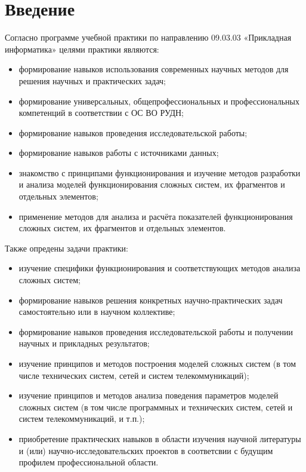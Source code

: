 \chapter*{Введение}

Согласно программе учебной практики по направлению 09.03.03
«Прикладная информатика» целями практики являются:
\begin{itemize}
\item формирование навыков использования современных научных методов
  для решения научных и практических задач;
\item формирование универсальных, общепрофессиональных и
  профессиональных компетенций в соответствии с ОС ВО РУДН;
\item формирование навыков проведения исследовательской работы;
\item формирование навыков работы с источниками данных;
\item знакомство с принципами функционирования и изучение методов
  разработки и анализа моделей функционирования сложных систем, их
  фрагментов и отдельных элементов;
\item применение методов для анализа и расчёта показателей
  функционирования сложных систем, их фрагментов и отдельных
  элементов.
\end{itemize}

Также опредены задачи практики:
\begin{itemize}
\item изучение специфики функционирования и соответствующих методов
  анализа сложных систем;
\item формирование навыков решения конкретных научно-практических
  задач самостоятельно или в научном коллективе;
\item формирование навыков проведения исследовательской работы и
  получении научных и прикладных результатов;
\item изучение принципов и методов построения моделей сложных систем
  (в том числе технических систем, сетей и систем телекоммуникаций);
\item изучение принципов и методов анализа поведения параметров
  моделей сложных систем (в том числе программных и технических
  систем, сетей и систем телекоммуникаций, и т.п.);
\item приобретение практических навыков в области изучения научной
  литературы и (или) научно-исследовательских проектов в соответсвии с
  будущим профилем профессиональной области.
\end{itemize}


